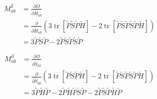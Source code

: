 \documentclass{article}
\newcommand{\tr}{\operatorname{tr}}
\begin{document}
\begin{align*}
    M^2_{ab} &= \frac{\partial \Omega}{\partial \tilde H_{ab}}\\
    & = \frac{\partial}{\partial \tilde H_{ab}} \left (3\tr[\tilde P \tilde S \tilde P \tilde H ] - 2\tr[\tilde P \tilde S \tilde P \tilde S \tilde P \tilde H] \right )\\
    & = 3 \tilde P \tilde S \tilde P - 2 \tilde P \tilde S \tilde P \tilde S \tilde P
\end{align*}

\begin{align*}
    M^3_{ab} &= \frac{\partial \Omega}{\partial \tilde S_{ab}}\\
    & = \frac{\partial}{\partial \tilde S_{ab}} \left (3\tr[\tilde P \tilde S \tilde P \tilde H ] - 2\tr[\tilde P \tilde S \tilde P \tilde S \tilde P \tilde H] \right )\\
    & =  3\tilde P \tilde H  \tilde P - 2 \tilde P \tilde H\tilde P\tilde  S\tilde  P  - 2 \tilde P\tilde S \tilde P\tilde H\tilde P
\end{align*}


\end{document}

